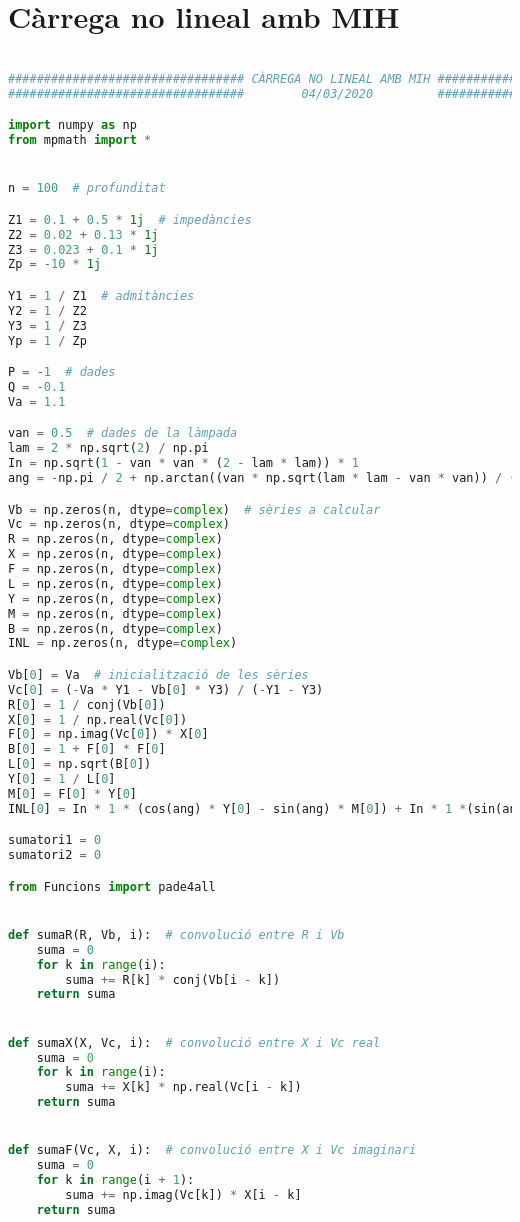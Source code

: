 \section{Càrrega no lineal amb MIH}
\begin{lstlisting}[language=Python,numbers=none]

################################# CÀRREGA NO LINEAL AMB MIH ##################################
#################################        04/03/2020         ##################################

import numpy as np
from mpmath import *


n = 100  # profunditat

Z1 = 0.1 + 0.5 * 1j  # impedàncies
Z2 = 0.02 + 0.13 * 1j
Z3 = 0.023 + 0.1 * 1j
Zp = -10 * 1j

Y1 = 1 / Z1  # admitàncies
Y2 = 1 / Z2
Y3 = 1 / Z3
Yp = 1 / Zp

P = -1  # dades
Q = -0.1
Va = 1.1

van = 0.5  # dades de la làmpada
lam = 2 * np.sqrt(2) / np.pi
In = np.sqrt(1 - van * van * (2 - lam * lam)) * 1
ang = -np.pi / 2 + np.arctan((van * np.sqrt(lam * lam - van * van)) / (1 - van * van))

Vb = np.zeros(n, dtype=complex)  # sèries a calcular
Vc = np.zeros(n, dtype=complex)
R = np.zeros(n, dtype=complex)
X = np.zeros(n, dtype=complex)
F = np.zeros(n, dtype=complex)
L = np.zeros(n, dtype=complex)
Y = np.zeros(n, dtype=complex)
M = np.zeros(n, dtype=complex)
B = np.zeros(n, dtype=complex)
INL = np.zeros(n, dtype=complex)

Vb[0] = Va  # inicialització de les sèries
Vc[0] = (-Va * Y1 - Vb[0] * Y3) / (-Y1 - Y3)
R[0] = 1 / conj(Vb[0])
X[0] = 1 / np.real(Vc[0])
F[0] = np.imag(Vc[0]) * X[0]
B[0] = 1 + F[0] * F[0]
L[0] = np.sqrt(B[0])
Y[0] = 1 / L[0]
M[0] = F[0] * Y[0]
INL[0] = In * 1 * (cos(ang) * Y[0] - sin(ang) * M[0]) + In * 1 *(sin(ang) * Y[0] + cos(ang) * M[0])*1j

sumatori1 = 0
sumatori2 = 0

from Funcions import pade4all


def sumaR(R, Vb, i):  # convolució entre R i Vb
    suma = 0
    for k in range(i):
        suma += R[k] * conj(Vb[i - k])
    return suma


def sumaX(X, Vc, i):  # convolució entre X i Vc real
    suma = 0
    for k in range(i):
        suma += X[k] * np.real(Vc[i - k])
    return suma


def sumaF(Vc, X, i):  # convolució entre X i Vc imaginari
    suma = 0
    for k in range(i + 1):
        suma += np.imag(Vc[k]) * X[i - k]
    return suma



\end{lstlisting}
